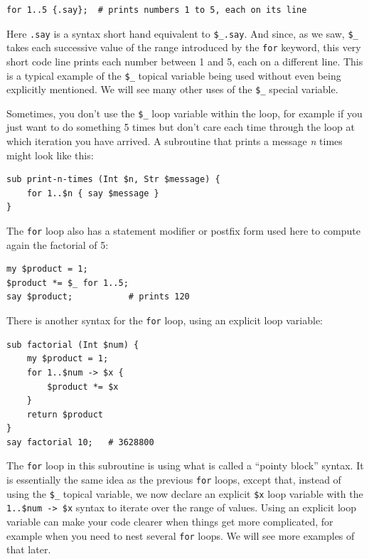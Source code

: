 \begin{verbatim}
for 1..5 {.say};  # prints numbers 1 to 5, each on its line
\end{verbatim} 

Here {\tt .say} is a syntax short hand equivalent to \verb"$_.say". 
And since, as we saw, \verb"$_" takes each successive value of 
the range introduced by the {\tt for} keyword, this very short code 
line prints each number between 1 and 5, each on a different line. 
This is a typical example of the \verb"$_" topical variable being used 
without even being explicitly mentioned. We will see many other 
uses of the \verb"$_" special variable. 

Sometimes, you don't use the \verb"$_" loop variable within the 
loop, for example if you just want to do something 5 times but don't 
care each time through the loop at which iteration you 
have arrived. A subroutine that prints a message \emph{n} times 
might look like this:

\begin{verbatim}
sub print-n-times (Int $n, Str $message) {
    for 1..$n { say $message }
} 
\end{verbatim} 


The {\tt for} loop also has a statement modifier or postfix form 
used here to compute again the factorial of 5:

\begin{verbatim}
my $product = 1;
$product *= $_ for 1..5;
say $product;           # prints 120
\end{verbatim} 

There is another syntax for the {\tt for} loop, using an explicit loop variable:

\begin{verbatim}
sub factorial (Int $num) { 
    my $product = 1;  
    for 1..$num -> $x { 
        $product *= $x
    }
    return $product
}
say factorial 10;   # 3628800
\end{verbatim} 

The {\tt for} loop in this subroutine is using what is called 
a ``pointy block'' syntax. It is essentially the same idea 
as the previous {\tt for} loops, except that, 
instead of using the \verb"$_" topical variable, we 
now declare an explicit \verb"$x" loop variable with the 
\verb"1..$num -> $x" syntax to iterate over the range 
of values. Using an explicit loop variable can make your 
code clearer when things get more complicated, for example 
when you need to nest several {\tt for} loops. We will 
see more examples of that later.

